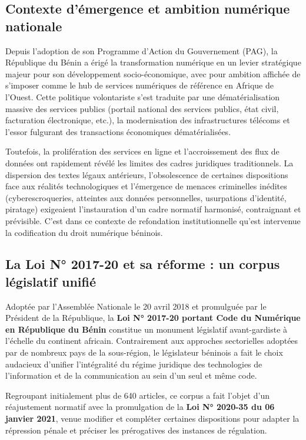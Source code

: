 \subsection{Contexte d'émergence et ambition numérique nationale}

Depuis l'adoption de son Programme d'Action du Gouvernement (PAG), la République du Bénin a érigé la transformation numérique en un levier stratégique majeur pour son développement socio-économique, avec pour ambition affichée de s'imposer comme le hub de services numériques de référence en Afrique de l'Ouest. Cette politique volontariste s'est traduite par une dématérialisation massive des services publics (portail national des services publics, état civil, facturation électronique, etc.), la modernisation des infrastructures télécoms et l'essor fulgurant des transactions économiques dématérialisées.

Toutefois, la prolifération des services en ligne et l'accroissement des flux de données ont rapidement révélé les limites des cadres juridiques traditionnels. La dispersion des textes légaux antérieurs, l'obsolescence de certaines dispositions face aux réalités technologiques et l'émergence de menaces criminelles inédites (cyberescroqueries, atteintes aux données personnelles, usurpations d'identité, piratage) exigeaient l'instauration d'un cadre normatif harmonisé, contraignant et prévisible. C'est dans ce contexte de refondation institutionnelle qu'est intervenue la codification du droit numérique béninois.

\subsection{La Loi N° 2017-20 et sa réforme : un corpus législatif unifié}

Adoptée par l'Assemblée Nationale le 20 avril 2018 et promulguée par le Président de la République, la \textbf{Loi N° 2017-20 portant Code du Numérique en République du Bénin} constitue un monument législatif avant-gardiste à l'échelle du continent africain. Contrairement aux approches sectorielles adoptées par de nombreux pays de la sous-région, le législateur béninois a fait le choix audacieux d'unifier l'intégralité du régime juridique des technologies de l'information et de la communication au sein d'un seul et même code.

Regroupant initialement plus de 640 articles, ce corpus a fait l'objet d'un réajustement normatif avec la promulgation de la \textbf{Loi N° 2020-35 du 06 janvier 2021}, venue modifier et compléter certaines dispositions pour adapter la répression pénale et préciser les prérogatives des instances de régulation.

